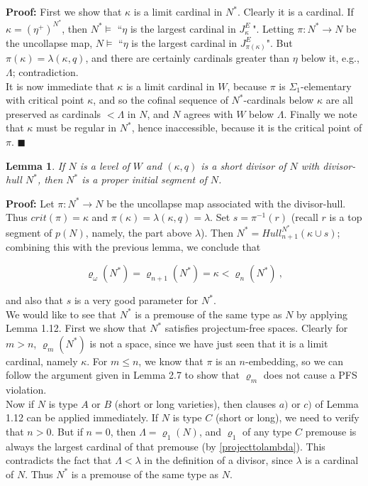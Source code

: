 \documentclass[12pt]{article}
\newtheorem{lem}[thm]{Lemma}
\begin{document}
\textbf{Proof:}  First we show that $\kappa$ is a limit cardinal in $N^*$.  Clearly it is a cardinal.  If $\kappa = ( \eta^+ )^{N^*}$, then $N^* \models$ ``$\eta$ is the largest cardinal in $J_\kappa^E \ $".  Letting $\pi: N^* \longrightarrow N$ be the uncollapse map, $N \models$ ``$\eta$ is the largest cardinal in $J_{\pi (\kappa )}^E$".  But $\pi (\kappa ) = \lambda (\kappa , q )$, and there are certainly cardinals greater than $\eta$ below it, e.g., $\Lambda$; contradiction.\\

It is now immediate that $\kappa$ is a limit cardinal in $W$, because $\pi$ is $\Sigma_1$-elementary with critical point $\kappa$, and so the cofinal sequence of $N^*$-cardinals below $\kappa$ are all preserved as cardinals $< \Lambda$ in $N$, and $N$ agrees with $W$ below $\Lambda$.  Finally we note that $\kappa$ must be regular in $N^*$, hence inaccessible, because it is the critical point of $\pi$.  $\blacksquare$\\


\begin{lem}
If $N$ is a level of $W$ and $(\kappa , q)$ is a short divisor of $N$ with divisor-hull $N^*$, then $N^*$ is a proper initial segment of $N$.
\end{lem}

\textbf{Proof:} Let $\pi: N^* \longrightarrow N$ be the uncollapse map associated with the divisor-hull.  Thus $crit(\pi) = \kappa$ and $\pi ( \kappa ) = \lambda ( \kappa , q) = \lambda$.  Set $s = \pi^{-1} (r)$ (recall $r$ is a top segment of $p (N)$, namely, the part above $\lambda$).  Then $N^* = Hull_{n+1}^{N^*} (\kappa \cup s)$; combining this with the previous lemma, we conclude that

\[
\varrho_\omega (N^*) = \varrho_{n + 1} (N^*) = \kappa < \varrho_n (N^*) \ ,
\]

and also that $s$ is a very good parameter for $N^*$.\\

 We would like to see that $N^*$ is a premouse of the same type as $N$ by applying Lemma 1.12.  First we show that $N^*$ satisfies projectum-free spaces.  Clearly for $m > n$, $\varrho_m (N^*)$ is not a space, since we have just seen that it is a limit cardinal, namely $\kappa$.  For $m \leq n$, we know that $\pi$ is an $n$-embedding, so we can follow the argument given in Lemma 2.7 to show that $\varrho_m$ does not cause a PFS violation.\\

Now if $N$ is type $A$ or $B$ (short or long varieties), then clauses $a)$ or $c)$ of Lemma 1.12 can be applied immediately.  If $N$ is type $C$ (short or long), we need to verify that $n > 0$.  But if $n = 0$, then $\Lambda = \varrho_1 (N)$, and $\varrho_1$ of any type $C$ premouse is always the largest cardinal of that premouse (by \ref{projecttolambda}).  This contradicts the fact that $\Lambda < \lambda$ in the definition of a divisor, since $\lambda$ is a cardinal of $N$.  Thus $N^*$ is a premouse of the same type as $N$.\\
\end{document}
